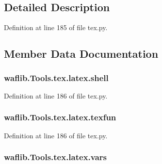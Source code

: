 \subsection{Detailed Description}


Definition at line 185 of file tex.\+py.



\subsection{Member Data Documentation}
\subsubsection[{\texorpdfstring{shell}{shell}}]{\setlength{\rightskip}{0pt plus 5cm}waflib.\+Tools.\+tex.\+latex.\+shell\hspace{0.3cm}{\ttfamily [static]}}\hypertarget{classwaflib_1_1_tools_1_1tex_1_1latex_a484dc715f52d249bd2fef4c99a0d6b36}{}\label{classwaflib_1_1_tools_1_1tex_1_1latex_a484dc715f52d249bd2fef4c99a0d6b36}


Definition at line 186 of file tex.\+py.

\subsubsection[{\texorpdfstring{texfun}{texfun}}]{\setlength{\rightskip}{0pt plus 5cm}waflib.\+Tools.\+tex.\+latex.\+texfun\hspace{0.3cm}{\ttfamily [static]}}\hypertarget{classwaflib_1_1_tools_1_1tex_1_1latex_afe6f036808f437b1973143b3bfa013e9}{}\label{classwaflib_1_1_tools_1_1tex_1_1latex_afe6f036808f437b1973143b3bfa013e9}


Definition at line 186 of file tex.\+py.

\subsubsection[{\texorpdfstring{vars}{vars}}]{\setlength{\rightskip}{0pt plus 5cm}waflib.\+Tools.\+tex.\+latex.\+vars\hspace{0.3cm}{\ttfamily [static]}}\hypertarget{classwaflib_1_1_tools_1_1tex_1_1latex_a1377bf11d409dad09761f03aa63f97fc}{}\label{classwaflib_1_1_tools_1_1tex_1_1latex_a1377bf11d409dad09761f03aa63f97fc}


